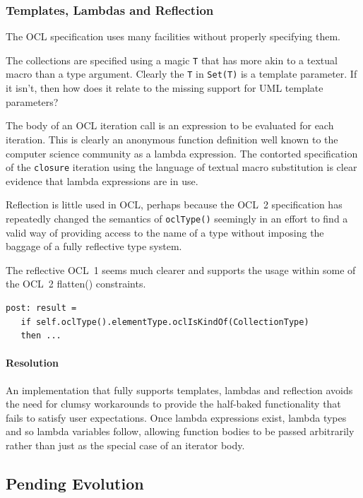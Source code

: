 \documentclass{jot}
\begin{document}
\subsubsection{Templates, Lambdas and Reflection}

The OCL specification uses many facilities without properly specifying them.

The collections are specified using a magic \verb$T$ that has more akin to a textual macro than a type argument. Clearly the \verb$T$ in \verb$Set(T)$ is a template parameter. If it isn't, then how does it relate to the missing support for UML template parameters?

The body of an OCL iteration call is an expression to be evaluated for each iteration. This is clearly an anonymous function definition well known to the computer science community as a lambda expression. The contorted specification of the \verb$closure$ iteration using the language of textual macro substitution is clear evidence that lambda expressions are in use.

Reflection is little used in OCL, perhaps because the OCL~2 specification has repeatedly changed the semantics of \verb$oclType()$ seemingly in an effort to find a valid way of providing access to the name of a type without imposing the baggage of a fully reflective type system.

The reflective OCL~1 seems much clearer and supports the usage within some of the OCL~2 flatten() constraints.

\begin{verbatim}
post: result =
   if self.oclType().elementType.oclIsKindOf(CollectionType)
   then ...
\end{verbatim}

\paragraph{Resolution} An implementation that fully supports templates, lambdas and reflection avoids the need for clumsy workarounds to provide the half-baked functionality that fails to satisfy user expectations. Once lambda expressions exist, lambda types and so lambda variables follow, allowing function bodies to be passed arbitrarily rather than just as the special case of an iterator body.

\subsection{Pending Evolution}
\end{document}

